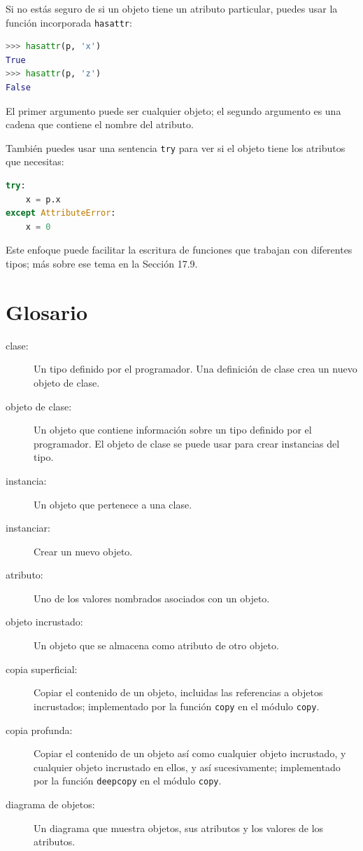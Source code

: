Si no estás seguro de si un objeto tiene un atributo particular, puedes usar la función incorporada \texttt{hasattr}:

\begin{lstlisting}[language=Python]
>>> hasattr(p, 'x')
True
>>> hasattr(p, 'z')
False
\end{lstlisting}

El primer argumento puede ser cualquier objeto; el segundo argumento es una cadena que contiene el nombre del atributo.

También puedes usar una sentencia \texttt{try} para ver si el objeto tiene los atributos que necesitas:

\begin{lstlisting}[language=Python]
try:
    x = p.x
except AttributeError:
    x = 0
\end{lstlisting}

Este enfoque puede facilitar la escritura de funciones que trabajan con diferentes tipos; más sobre ese tema en la Sección 17.9.

\section{Glosario}

\begin{description}
    \item[clase:] Un tipo definido por el programador. Una definición de clase crea un nuevo objeto de clase.
    \item[objeto de clase:] Un objeto que contiene información sobre un tipo definido por el programador. El objeto de clase se puede usar para crear instancias del tipo.
    \item[instancia:] Un objeto que pertenece a una clase.
    \item[instanciar:] Crear un nuevo objeto.
    \item[atributo:] Uno de los valores nombrados asociados con un objeto.
    \item[objeto incrustado:] Un objeto que se almacena como atributo de otro objeto.
    \item[copia superficial:] Copiar el contenido de un objeto, incluidas las referencias a objetos incrustados; implementado por la función \texttt{copy} en el módulo \texttt{copy}.
    \item[copia profunda:] Copiar el contenido de un objeto así como cualquier objeto incrustado, y cualquier objeto incrustado en ellos, y así sucesivamente; implementado por la función \texttt{deepcopy} en el módulo \texttt{copy}.
    \item[diagrama de objetos:] Un diagrama que muestra objetos, sus atributos y los valores de los atributos.
\end{description}

